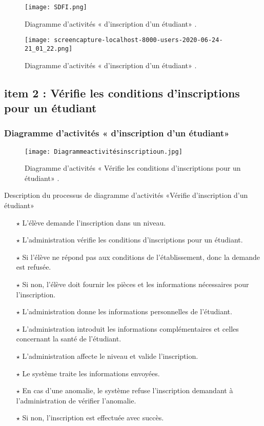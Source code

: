  \begin{figure}[ht]
 	\centering
 	\texttt{[image: SDFI.png]}
 	\caption{Diagramme d'activités « d'inscription d'un étudiant» .}
 	\label{fig:Diagramme d' activités  d' inscription d'un étudiant   }
 \end{figure}
 \FloatBarrier
 
  \begin{figure}[ht]
 	\centering
 	\texttt{[image: screencapture-localhost-8000-users-2020-06-24-21\_01\_22.png]}
 	\caption{Diagramme d'activités « d'inscription d'un étudiant» .}
 	\label{fig:Diagramme d' activités  d' inscription d'un étudiant   }
 \end{figure}
 \FloatBarrier
\clearpage
\subsection{item 2 : Vérifie les conditions d’inscriptions pour un étudiant}


\subsubsection{Diagramme d'activités « d'inscription d'un étudiant» }
\begin{figure}[ht]
	\centering
	\texttt{[image: Diagrammeactivitésinscriptioun.jpg]}
	\caption{Diagramme d'activités « Vérifie les conditions d’inscriptions pour un étudiant» .}
	\label{fig:Diagramme d' activités Vérifie d' inscription d'un étudiant   }
\end{figure}
\FloatBarrier
{\Large \color{cyan} Description du processus de diagramme d’activités «Vérifie d'inscription d'un étudiant»}

\begin{itemize}	
\item[$\star$]L’élève demande l’inscription dans un niveau.
\item[$\star$] L’administration vérifie les conditions d’inscriptions pour un étudiant.
\item[$\star$] Si l’élève ne répond pas aux conditions de l’établissement, donc la demande est refusée.
\item[$\star$] Si non, l’élève doit fournir les pièces et les informations nécessaires pour
l’inscription.
\item[$\star$] L’administration donne les informations personnelles de l’étudiant.
\item[$\star$] L’administration introduit les informations complémentaires et celles concernant la santé de l’étudiant.
\item[$\star$] L’administration affecte le niveau et valide l’inscription.
\item[$\star$] Le système traite les informations envoyées.
\item[$\star$] En cas d’une anomalie, le système refuse l’inscription demandant à l’administration de vérifier l’anomalie.
\item[$\star$] Si non, l’inscription est effectuée avec succès.
\end{itemize}	
